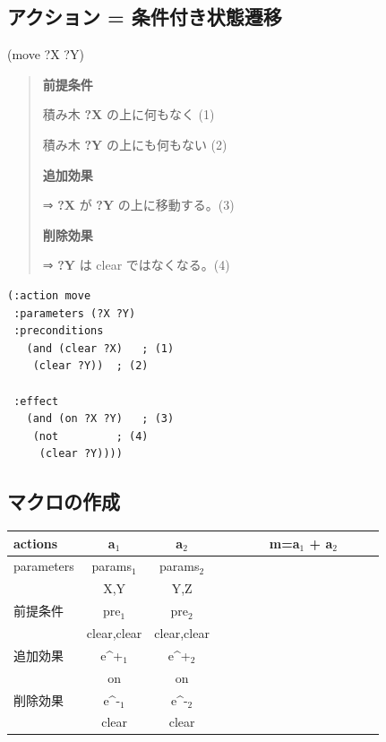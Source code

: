 \subsection{アクション = 条件付き状態遷移}
\label{sec-6-2}

\begin{center}
\begin{xlarge}
(move ?X ?Y)
\end{xlarge}
\end{center}


\begin{container-fluid}
\begin{row-fluid}
\begin{span7}
\begin{quote}
\textbf{前提条件}

積み木 \textbf{?X} の上に何もなく (1)

積み木 \textbf{?Y} の上にも何もない (2)

\textbf{追加効果}

⇒ \textbf{?X} が \textbf{?Y} の上に移動する。(3)

\textbf{削除効果}

⇒ \textbf{?Y} は clear ではなくなる。(4)
\end{quote}
\end{span7}
\begin{span5}
\begin{verbatim}
(:action move
 :parameters (?X ?Y)
 :preconditions
   (and (clear ?X)   ; (1)
	(clear ?Y))  ; (2)

 :effect
   (and (on ?X ?Y)   ; (3)
	(not         ; (4)
	 (clear ?Y))))
\end{verbatim}
\end{span5}
\end{row-fluid}
\end{container-fluid}

\subsection{マクロの作成}
\label{sec-6-3}

\begin{center}
\begin{center}
\begin{tabular}{l|cc|l|c|}
actions & a$_{\text{1}}$ & a$_{\text{2}}$ &  & m=a$_{\text{1}}$ + a$_{\text{2}}$\\
\hline
parameters & params$_{\text{1}}$ & params$_{\text{2}}$ &  & 　　　　　　　　　　　\\
 & X,Y & Y,Z &  & \\
前提条件 & pre$_{\text{1}}$ & pre$_{\text{2}}$ &  & \\
 & clear,clear & clear,clear &  & \\
追加効果 & e\^{}+$_{\text{1}}$ & e\^{}+$_{\text{2}}$ &  & \\
 & on & on &  & \\
削除効果 & e\^{}-$_{\text{1}}$ & e\^{}-$_{\text{2}}$ &  & \\
 & clear & clear &  & \\
\end{tabular}
\end{center}
\end{center}

